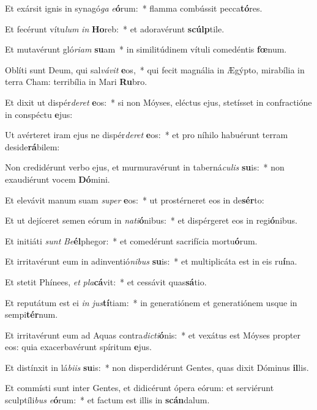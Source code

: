 \item Et exársit ignis in synagó\textit{ga} \textit{e}\textbf{ó}rum:~* flamma combússit pecca\textbf{tó}res.
\item Et fecérunt vítu\textit{lum} \textit{in} \textbf{Ho}reb:~* et adoravérunt \textbf{scúlp}tile.
\item Et mutavérunt gló\textit{ri}\textit{am} \textbf{su}am~* in similitúdinem vítuli comedéntis \textbf{fœ}num.
\item Oblíti sunt Deum, qui sal\textit{vá}\textit{vit} \textbf{e}os,~* qui fecit magnália in Ægýpto, mirabília in terra Cham: terribília in Mari \textbf{Ru}bro.
\item Et dixit ut dispér\textit{de}\textit{ret} \textbf{e}os:~* si non Móyses, eléctus ejus, stetísset in confractióne in conspéctu \textbf{e}jus:
\item Ut avérteret iram ejus ne dispér\textit{de}\textit{ret} \textbf{e}os:~* et pro níhilo habuérunt terram deside\textbf{rá}bilem:
\item Non credidérunt verbo ejus, et murmuravérunt in taberná\textit{cu}\textit{lis} \textbf{su}is:~* non exaudiérunt vocem \textbf{Dó}mini.
\item Et elevávit manum suam \textit{su}\textit{per} \textbf{e}os:~* ut prostérneret eos in de\textbf{sér}to:
\item Et ut dejíceret semen eórum in \textit{na}\textit{ti}\textbf{ó}nibus:~* et dispérgeret eos in regi\textbf{ó}nibus.
\item Et initiáti \textit{sunt} \textit{Be}\textbf{él}phegor:~* et comedérunt sacrifícia mortu\textbf{ó}rum.
\item Et irritavérunt eum in adinventió\textit{ni}\textit{bus} \textbf{su}is:~* et multiplicáta est in eis ru\textbf{í}na.
\item Et stetit Phínees, \textit{et} \textit{pla}\textbf{cá}vit:~* et cessávit quas\textbf{sá}tio.
\item Et reputátum est ei \textit{in} \textit{jus}\textbf{tí}tiam:~* in generatiónem et generatiónem usque in sempi\textbf{tér}num.
\item Et irritavérunt eum ad Aquas contra\textit{dic}\textit{ti}\textbf{ó}nis:~* et vexátus est Móyses propter eos: quia exacerbavérunt spíritum \textbf{e}jus.
\item Et distínxit in lá\textit{bi}\textit{is} \textbf{su}is:~* non disperdidérunt Gentes, quas dixit Dóminus \textbf{il}lis.
\item Et commísti sunt inter Gentes, et didicérunt ópera eórum: et serviérunt sculptíli\textit{bus} \textit{e}\textbf{ó}rum:~* et factum est illis in \textbf{scán}dalum.
